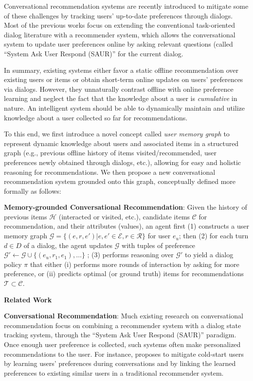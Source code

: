 Conversational recommendation systems \cite{li2018towards} are recently introduced to mitigate some of these challenges by tracking users' up-to-date preferences through dialogs.
Most of the previous works focus on extending the conventional task-oriented dialog literature with a recommender system, which allows the conversational system to update user preferences online by asking relevant questions (called ``System Ask User Respond (SAUR)'' for the current dialog.

In summary, existing systems either favor a static offline recommendation over existing users or items or obtain short-term online updates on users' preferences via dialogs.
However, they unnaturally contrast offline with online preference learning and neglect the fact that the knowledge about a user is \textit{cumulative} in nature.
An intelligent system should be able to dynamically maintain and utilize knowledge about a user collected so far for recommendations.

To this end, we first introduce a novel concept called \textit{user memory graph} to represent dynamic knowledge about users and associated items in a structured graph (e.g., previous offline history of items visited/recommended, user preferences newly obtained through dialogs, etc.), allowing for easy and holistic reasoning for recommendations.
We then propose a new conversational recommendation system grounded onto this graph, conceptually defined more formally as follows:

\noindent\textbf{Memory-grounded Conversational Recommendation}:
Given the history of previous items $\mathcal{H}$ (interacted or visited, etc.), candidate items $\mathcal{C}$ for recommendation, and their attributes (values), 
an agent first (1) constructs a user memory graph $\mathcal{G} = \{(e, r, e')\vert e, e' \in \mathcal{E}, r \in \mathcal{R} \}$ for user $e_u$; 
then (2) for each turn $d \in D$ of a dialog, the agent updates $\mathcal{G}$ with tuples of preference $\mathcal{G}' \gets \mathcal{G} \cup \{(e_u, r_1, e_1), \dots\}$ ;
(3) performs reasoning over $\mathcal{G}'$ to yield a dialog policy $\pi$ that
either (i) performs more rounds of interaction by asking for more preference, 
or (ii) predicts optimal (or ground truth) items for recommendations $\mathcal{T} \subset \mathcal{C}$.

\textbf{Related Work}

\noindent \textbf{Conversational Recommendation}:
Much existing research on conversational recommendation focus on combining a recommender system with a dialog state tracking system, through the ``System Ask User Respond (SAUR)'' paradigm.
Once enough user preference is collected, such systems often make personalized recommendations to the user.
For instance, \cite{li2018towards} proposes to mitigate cold-start users by learning users' preferences during conversations and by linking the learned preferences to existing similar users in a traditional recommender system.

